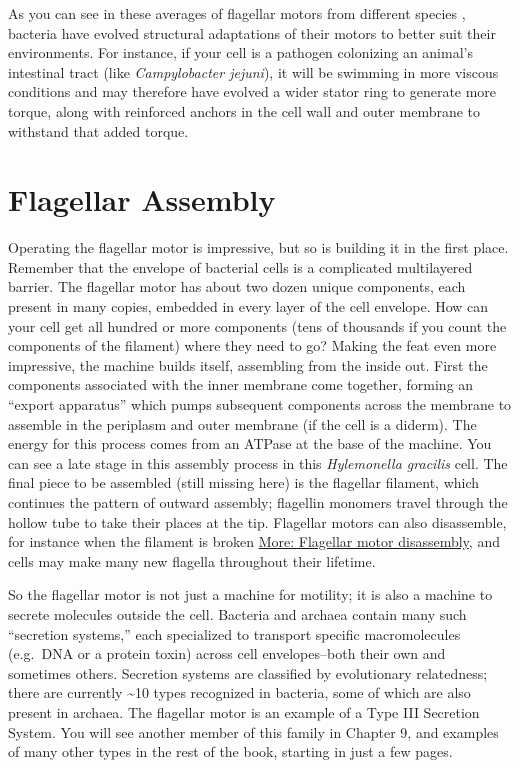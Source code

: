 \documentclass[]{tufte-book}
\begin{document}
As you can see in these averages of flagellar motors from different species \citep{murphy2006} \citep{chen2011} \citep{zhao2014} \citep{beeby2016} \citep{qin2017} \citep{chaban2018} \citep{kaplan2019} \citep{ferreira2019} \citep{chang2019}, bacteria have evolved structural adaptations of their motors to better suit their environments. For instance, if your cell is a pathogen colonizing an animal's intestinal tract (like \emph{Campylobacter jejuni}), it will be swimming in more viscous conditions and may therefore have evolved a wider stator ring to generate more torque, along with reinforced anchors in the cell wall and outer membrane to withstand that added torque.

\hypertarget{flagellar-assembly}{%
\section{Flagellar Assembly}\label{flagellar-assembly}}

Operating the flagellar motor is impressive, but so is building it in the first place. Remember that the envelope of bacterial cells is a complicated multilayered barrier. The flagellar motor has about two dozen unique components, each present in many copies, embedded in every layer of the cell envelope. How can your cell get all hundred or more components (tens of thousands if you count the components of the filament) where they need to go? Making the feat even more impressive, the machine builds itself, assembling from the inside out. First the components associated with the inner membrane come together, forming an ``export apparatus'' which pumps subsequent components across the membrane to assemble in the periplasm and outer membrane (if the cell is a diderm). The energy for this process comes from an ATPase at the base of the machine. You can see a late stage in this assembly process in this \emph{Hylemonella gracilis} cell. The final piece to be assembled (still missing here) is the flagellar filament, which continues the pattern of outward assembly; flagellin monomers travel through the hollow tube to take their places at the tip. Flagellar motors can also disassemble, for instance when the filament is broken \protect\hyperlink{Flagellar_motor_disassembly}{More: Flagellar motor disassembly}, and cells may make many new flagella throughout their lifetime.

So the flagellar motor is not just a machine for motility; it is also a machine to secrete molecules outside the cell. Bacteria and archaea contain many such ``secretion systems,'' each specialized to transport specific macromolecules (e.g.~DNA or a protein toxin) across cell envelopes--both their own and sometimes others. Secretion systems are classified by evolutionary relatedness; there are currently \textasciitilde{}10 types recognized in bacteria, some of which are also present in archaea. The flagellar motor is an example of a Type III Secretion System. You will see another member of this family in Chapter 9, and examples of many other types in the rest of the book, starting in just a few pages.
\end{document}
